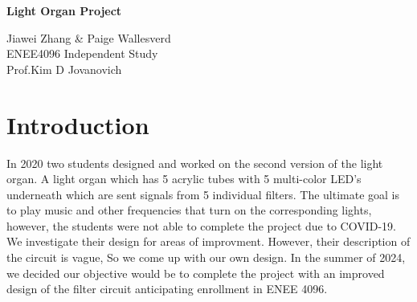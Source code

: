 \documentclass[12pt,a4paper]{article}
\begin{document}
\large
    \begin{titlepage}
    \centering
    \vspace*{\fill}

    \vspace*{0.5cm}

    \huge\bfseries
    Light Organ Project

    \vspace*{0.5cm}

    \large Jiawei Zhang \& Paige Wallesverd \\
    ENEE4096 Independent Study \\
    Prof.Kim D Jovanovich

    \vspace*{\fill}
    \end{titlepage}
    \section*{Introduction}
    In 2020 two students designed and worked on the second version of the light organ. 
    A light organ which has 5 acrylic tubes with 5 multi-color LED's underneath which are sent signals from 5 individual filters. The ultimate goal is to play music and other frequencies that turn on the corresponding lights, however, the students were not able to complete the project due to COVID-19. We investigate their design for areas of improvment. However, their description of the circuit is vague, So we come up with our own design.
    In the summer of 2024, we decided our objective would be to complete the project with an improved design of the filter circuit anticipating enrollment in ENEE 4096.


    
    
\end{document}
